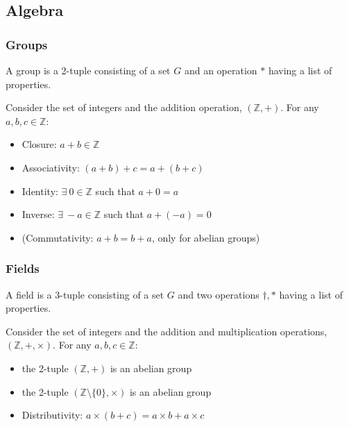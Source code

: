\documentclass{beamer}
\begin{document}
\subsection{Algebra}

\begin{frame}
\frametitle{Groups}
A group is a 2-tuple consisting of a set $G$ and an operation $*$ having a list of properties.

Consider the set of integers and the addition operation, $(\mathbb Z,+)$.  For any $a,b,c \in \mathbb Z$:
\begin{itemize}
  \item Closure: $a + b \in \mathbb Z$
  \item Associativity: $(a + b) + c = a + (b + c)$
  \item Identity: $\exists\ 0 \in \mathbb Z$ such that $a + 0 = a$
  \item Inverse: $\exists\ -a \in \mathbb Z$ such that $a + (-a) = 0$
  \item (Commutativity: $a + b = b + a$, only for abelian groups)
\end{itemize}
\end{frame}

\begin{frame}
\frametitle{Fields}
A field is a 3-tuple consisting of a set $G$ and two operations $\dag,*$ having a list of properties.

Consider the set of integers and the addition and multiplication operations, $(\mathbb Z,+,\times)$.  For any $a,b,c \in \mathbb Z$:
\begin{itemize}
  \item the 2-tuple $(\mathbb Z,+)$ is an abelian group
  \item the 2-tuple $(\mathbb Z \setminus \{0\},\times)$ is an abelian group
  \item Distributivity: $a\times(b + c) = a\times b + a\times c$
\end{itemize}
\end{frame}
\end{document}
